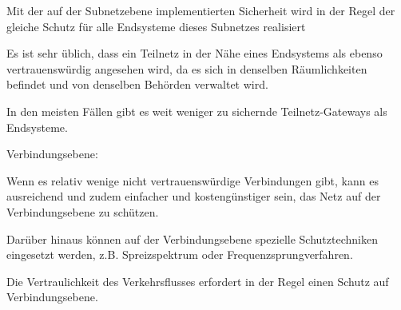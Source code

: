 \documentclass[a4paper]{article}
\begin{document}
\begin{multicols}{3}
\begin{itemize*}
\begin{itemize*}
                  \begin{itemize*}
                        \item Mit der auf der Subnetzebene implementierten Sicherheit wird in der Regel der gleiche Schutz für alle Endsysteme dieses Subnetzes realisiert
                  \end{itemize*}
                  \item Es ist sehr üblich, dass ein Teilnetz in der Nähe eines Endsystems als ebenso vertrauenswürdig angesehen wird, da es sich in denselben Räumlichkeiten befindet und von denselben Behörden verwaltet wird.
                  \item In den meisten Fällen gibt es weit weniger zu sichernde Teilnetz-Gateways als Endsysteme.
            \end{itemize*}
            \item Verbindungsebene:
            \begin{itemize*}
                  \item Wenn es relativ wenige nicht vertrauenswürdige Verbindungen gibt, kann es ausreichend und zudem einfacher und kostengünstiger sein, das Netz auf der Verbindungsebene zu schützen.
                  \item Darüber hinaus können auf der Verbindungsebene spezielle Schutztechniken eingesetzt werden, z.B. Spreizspektrum oder Frequenzsprungverfahren.
                  \item Die Vertraulichkeit des Verkehrsflusses erfordert in der Regel einen Schutz auf Verbindungsebene.
            \end{itemize*}
      \end{itemize*}


\end{multicols}
\end{document}
